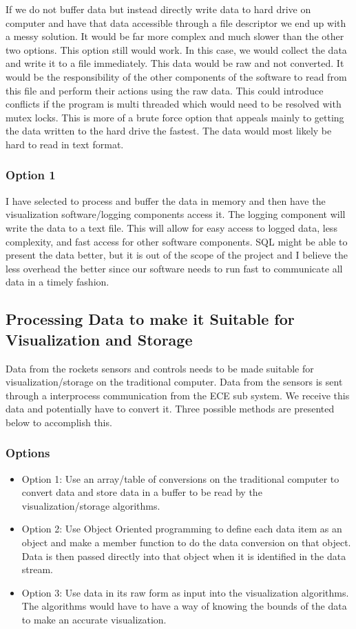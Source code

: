 \documentclass[10pt,draftclsnofoot,onecolumn]{IEEEtran}
\begin{document}
      If we do not buffer data but instead directly write data to hard drive on computer and have that data accessible through a file descriptor we end up with a messy solution. It would be far more complex and much slower than the other two options. This option still would work. In this case, we would collect the data and write it to a file immediately. This data would be raw and not converted. It would be the responsibility of the other components of the software to read from this file and perform their actions using the raw data. This could introduce conflicts if the program is multi threaded which would need to be resolved with mutex locks. This is more of a brute force option that appeals mainly to getting the data written to the hard drive the fastest. The data would most likely be hard to read in text format.\\

\subsubsection{Option 1}
I have selected to process and buffer the data in memory and then have the visualization software/logging components access it. The logging component will write the data to a text file. This will allow for easy access to logged data, less complexity, and fast access for other software components. SQL might be able to present the data better, but it is out of the scope of the project and I believe the less overhead the better since our software needs to run fast to communicate all data in a timely fashion.\\

\subsection{Processing Data to make it Suitable for Visualization and Storage}
Data from the rockets sensors and controls needs to be made suitable for visualization/storage on the traditional computer. Data from the sensors is sent through a interprocess communication from the ECE sub system. We receive this data and potentially have to convert it. Three possible methods are presented below to accomplish this.\\
\subsubsection{Options}
\begin{itemize}
	\item Option 1: Use an array/table of conversions on the traditional computer to convert data and store data in a buffer to be read by the visualization/storage algorithms. 
	\item Option 2: Use Object Oriented programming to define each data item as an object and make a member function to do the data conversion on that object. Data is then passed directly into that object when it is identified in the data stream.
	\item Option 3: Use data in its raw form as input into the visualization algorithms. The algorithms would have to have a way of knowing the bounds of the data to make an accurate visualization. \\
	\end{itemize}
\end{document}

